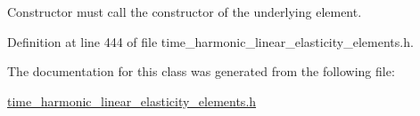 Constructor must call the constructor of the underlying element. 



Definition at line 444 of file time\+\_\+harmonic\+\_\+linear\+\_\+elasticity\+\_\+elements.\+h.



The documentation for this class was generated from the following file\+:\begin{DoxyCompactItemize}
\item 
\hyperlink{time__harmonic__linear__elasticity__elements_8h}{time\+\_\+harmonic\+\_\+linear\+\_\+elasticity\+\_\+elements.\+h}\end{DoxyCompactItemize}

